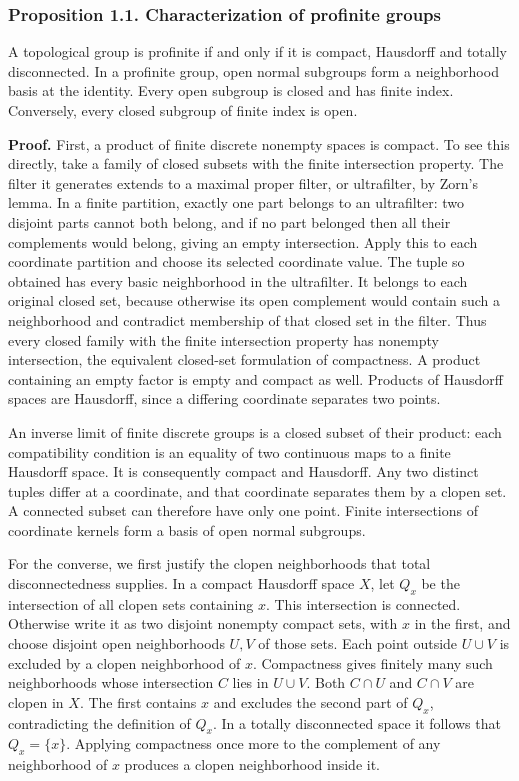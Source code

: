 \documentclass[11pt,a4paper]{article}
\begin{document}
\subsubsection{Proposition 1.1. Characterization of profinite
groups}\label{proposition-1.1.-characterization-of-profinite-groups}

A topological group is profinite if and only if it is compact, Hausdorff
and totally disconnected. In a profinite group, open normal subgroups
form a neighborhood basis at the identity. Every open subgroup is closed
and has finite index. Conversely, every closed subgroup of finite index
is open.

\textbf{Proof.} First, a product of finite discrete nonempty spaces is
compact. To see this directly, take a family of closed subsets with the
finite intersection property. The filter it generates extends to a
maximal proper filter, or ultrafilter, by Zorn's lemma. In a finite
partition, exactly one part belongs to an ultrafilter: two disjoint
parts cannot both belong, and if no part belonged then all their
complements would belong, giving an empty intersection. Apply this to
each coordinate partition and choose its selected coordinate value. The
tuple so obtained has every basic neighborhood in the ultrafilter. It
belongs to each original closed set, because otherwise its open
complement would contain such a neighborhood and contradict membership
of that closed set in the filter. Thus every closed family with the
finite intersection property has nonempty intersection, the equivalent
closed-set formulation of compactness. A product containing an empty
factor is empty and compact as well. Products of Hausdorff spaces are
Hausdorff, since a differing coordinate separates two points.

An inverse limit of finite discrete groups is a closed subset of their
product: each compatibility condition is an equality of two continuous
maps to a finite Hausdorff space. It is consequently compact and
Hausdorff. Any two distinct tuples differ at a coordinate, and that
coordinate separates them by a clopen set. A connected subset can
therefore have only one point. Finite intersections of coordinate
kernels form a basis of open normal subgroups.

For the converse, we first justify the clopen neighborhoods that total
disconnectedness supplies. In a compact Hausdorff space \(X\), let
\(Q_x\) be the intersection of all clopen sets containing \(x\). This
intersection is connected. Otherwise write it as two disjoint nonempty
compact sets, with \(x\) in the first, and choose disjoint open
neighborhoods \(U,V\) of those sets. Each point outside \(U\cup V\) is
excluded by a clopen neighborhood of \(x\). Compactness gives finitely
many such neighborhoods whose intersection \(C\) lies in \(U\cup V\).
Both \(C\cap U\) and \(C\cap V\) are clopen in \(X\). The first contains
\(x\) and excludes the second part of \(Q_x\), contradicting the
definition of \(Q_x\). In a totally disconnected space it follows that
\(Q_x=\{x\}\). Applying compactness once more to the complement of any
neighborhood of \(x\) produces a clopen neighborhood inside it.
\end{document}
